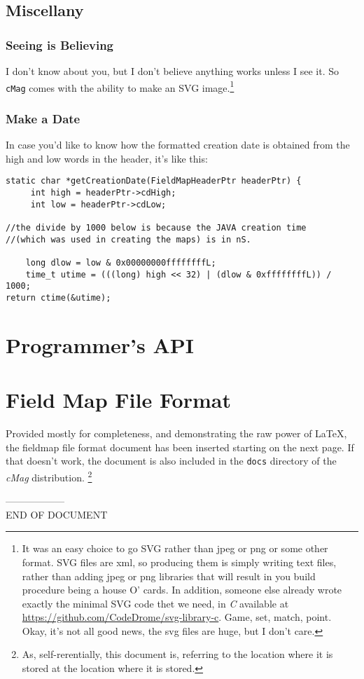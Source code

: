 \documentclass{article}
\begin{document}
\subsection {Miscellany}
\subsubsection{Seeing is Believing}
I don't know about you, but I don't believe anything works unless I see it. So \texttt{cMag} comes with the ability to make an SVG image.\footnote{It was an easy choice to go SVG rather than jpeg or png or some other format.  SVG files are xml, so producing them is simply writing text files, rather than adding jpeg or png libraries that will result in you build procedure being a house O' cards. In addition, someone else already wrote exactly the minimal SVG code thet we need, in \textit{C} available at \url{https://github.com/CodeDrome/svg-library-c}. Game, set, match, point.  Okay, it's not all good news, the svg files are huge, but I don't care.}
\subsubsection{Make a Date}
In case you'd like to know how the formatted creation date is obtained from the high and low words in the header, it's like this:
\begin{verbatim}
static char *getCreationDate(FieldMapHeaderPtr headerPtr) {
     int high = headerPtr->cdHigh;
     int low = headerPtr->cdLow;

//the divide by 1000 below is because the JAVA creation time 
//(which was used in creating the maps) is in nS.

    long dlow = low & 0x00000000ffffffffL;
    time_t utime = (((long) high << 32) | (dlow & 0xffffffffL)) / 1000;
return ctime(&utime);

\end{verbatim}

\newpage
\appendix
\section{Programmer's API}
\newpage
\section{Field Map File Format}
Provided mostly for completeness, and demonstrating the raw power of \LaTeX, the fieldmap file format document has been inserted starting on the next page. If that doesn't work, the document is also included in the  \texttt{docs} directory of the \textit{cMag} distribution. \footnote{ As, self-rerentially, this document is, referring to the location where it is stored at the location where it is stored.}


------------------\\
END OF DOCUMENT
\end{document}
